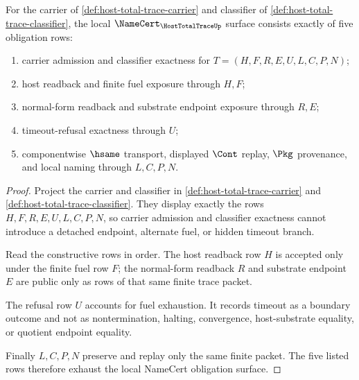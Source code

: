 \begin{theorem}
\label{thm:host-total-trace-namecert-obligations}
For the carrier of \autoref{def:host-total-trace-carrier} and classifier of \autoref{def:host-total-trace-classifier}, the local $\NameCert_{\HostTotalTraceUp}$ surface consists exactly of five obligation rows:
\begin{enumerate}
\item carrier admission and classifier exactness for $T=(H,F,R,E,U,L,C,P,N)$;
\item host readback and finite fuel exposure through $H,F$;
\item normal-form readback and substrate endpoint exposure through $R,E$;
\item timeout-refusal exactness through $U$;
\item componentwise $\hsame$ transport, displayed $\Cont$ replay, $\Pkg$ provenance, and local naming through $L,C,P,N$.
\end{enumerate}
\end{theorem}
\begin{proof}
Project the carrier and classifier in \autoref{def:host-total-trace-carrier} and \autoref{def:host-total-trace-classifier}. They display exactly the rows $H,F,R,E,U,L,C,P,N$, so carrier admission and classifier exactness cannot introduce a detached endpoint, alternate fuel, or hidden timeout branch.

Read the constructive rows in order. The host readback row $H$ is accepted only under the finite fuel row $F$; the normal-form readback $R$ and substrate endpoint $E$ are public only as rows of that same finite trace packet.

The refusal row $U$ accounts for fuel exhaustion. It records timeout as a boundary outcome and not as nontermination, halting, convergence, host-substrate equality, or quotient endpoint equality.

Finally $L,C,P,N$ preserve and replay only the same finite packet. The five listed rows therefore exhaust the local NameCert obligation surface.
\end{proof}

